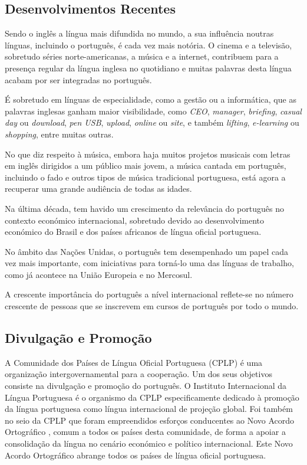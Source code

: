\begin{multicols}{2}
\subsection{Desenvolvimentos Recentes}

Sendo o inglês a língua mais difundida no mundo, a sua influência noutras línguas, incluindo o português, é cada vez mais notória. 
O cinema e a televisão, sobretudo séries norte-americanas, a música e a internet, contribuem para a presença regular da língua inglesa 
no quotidiano e muitas palavras desta língua acabam por ser integradas no português.

É sobretudo em línguas de especialidade, como a gestão ou a informática, que as palavras inglesas ganham maior visibilidade, como \textit{CEO}, \textit{ma\-na\-ger}, \textit{briefing}, \textit{casual day} ou \textit{download}, \textit{pen USB}, \textit{upload}, \textit{online} ou \textit{site}, e também \textit{lifting}, \textit{e-learning} ou \textit{shopping}, entre muitas outras.

No que diz respeito à música, embora haja muitos projetos musicais com letras em inglês dirigidos a um público mais jovem, a música cantada em português, incluindo o fado e outros tipos de música tradicional portuguesa, está agora a recuperar uma grande audiência de todas as idades.

Na última década, tem havido um crescimento da relevância do português no contexto económico internacional, sobretudo devido ao desenvolvimento económico do Brasil
e dos países africanos de língua oficial portuguesa. 

No âmbito das Nações Unidas, o português tem desempenhado um papel cada vez mais importante, com iniciativas para torná-lo uma das línguas de trabalho, como já acontece na União Europeia e no Mercosul.

A crescente importância do português a nível internacional reflete-se no número crescente de pessoas que se inscrevem em cursos de português por todo o mundo.



\subsection{Divulgação e Promoção}

A Comunidade dos Países de Língua Oficial Portuguesa (CPLP) é uma organização intergovernamental para a cooperação.
Um dos seus objetivos consiste na divulgação e promoção do português. 
O Instituto Internacional da Língua Portuguesa é o organismo da CPLP especificamente dedicado à promoção
da língua portuguesa como língua internacional de projeção global. 
Foi também no seio da CPLP que foram empreendidos esforços conducentes ao Novo Acordo Ortográfico \cite{pinto}, 
comum a todos os países desta comunidade, de forma a apoiar a consolidação da língua no cenário económico e político internacional. 
Este Novo Acordo Ortográfico abrange todos os países de língua oficial portuguesa.


\end{multicols}
